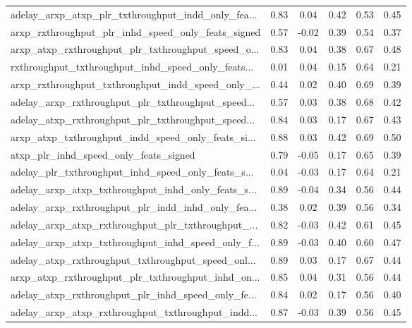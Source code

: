 \begin{tabular}{|l|*{4}{c}|r|}
adelay\_arxp\_atxp\_plr\_txthroughput\_indd\_only\_fea... & 0.83 &  0.04 &    0.42 &       0.53 &  0.45 \\
arxp\_rxthroughput\_plr\_inhd\_speed\_only\_feats\_signed & 0.57 & -0.02 &    0.39 &       0.54 &  0.37 \\
arxp\_atxp\_rxthroughput\_plr\_txthroughput\_speed\_o... & 0.83 &  0.04 &    0.38 &       0.67 &  0.48 \\
rxthroughput\_txthroughput\_inhd\_speed\_only\_feats... & 0.01 &  0.04 &    0.15 &       0.64 &  0.21 \\
arxp\_rxthroughput\_txthroughput\_indd\_speed\_only\_... & 0.44 &  0.02 &    0.40 &       0.69 &  0.39 \\
adelay\_arxp\_rxthroughput\_plr\_txthroughput\_speed... & 0.57 &  0.03 &    0.38 &       0.68 &  0.42 \\
adelay\_atxp\_rxthroughput\_plr\_txthroughput\_speed... & 0.84 &  0.03 &    0.17 &       0.67 &  0.43 \\
arxp\_atxp\_txthroughput\_indd\_speed\_only\_feats\_si... & 0.88 &  0.03 &    0.42 &       0.69 &  0.50 \\
atxp\_plr\_inhd\_speed\_only\_feats\_signed              & 0.79 & -0.05 &    0.17 &       0.65 &  0.39 \\
adelay\_plr\_txthroughput\_inhd\_speed\_only\_feats\_s... & 0.04 & -0.03 &    0.17 &       0.64 &  0.21 \\
adelay\_arxp\_atxp\_txthroughput\_inhd\_only\_feats\_s... & 0.89 & -0.04 &    0.34 &       0.56 &  0.44 \\
adelay\_arxp\_rxthroughput\_plr\_indd\_inhd\_only\_fea... & 0.38 &  0.02 &    0.39 &       0.56 &  0.34 \\
adelay\_arxp\_atxp\_rxthroughput\_plr\_txthroughput\_... & 0.82 & -0.03 &    0.42 &       0.61 &  0.45 \\
adelay\_arxp\_atxp\_txthroughput\_inhd\_speed\_only\_f... & 0.89 & -0.03 &    0.40 &       0.60 &  0.47 \\
adelay\_atxp\_rxthroughput\_txthroughput\_speed\_onl... & 0.89 &  0.03 &    0.17 &       0.67 &  0.44 \\
arxp\_atxp\_rxthroughput\_plr\_txthroughput\_inhd\_on... & 0.85 &  0.04 &    0.31 &       0.56 &  0.44 \\
adelay\_atxp\_rxthroughput\_plr\_inhd\_speed\_only\_fe... & 0.84 &  0.02 &    0.17 &       0.56 &  0.40 \\
adelay\_arxp\_atxp\_rxthroughput\_txthroughput\_indd... & 0.87 & -0.03 &    0.39 &       0.56 &  0.45 \\

\end{tabular}
